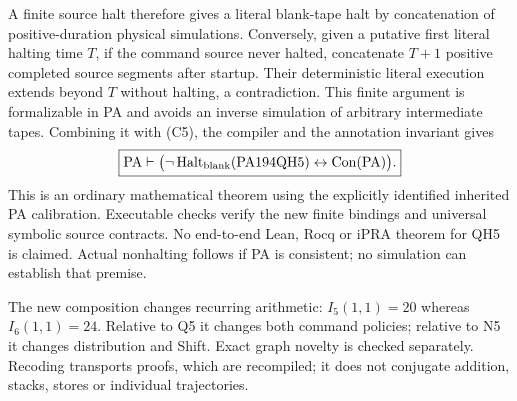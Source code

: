 A finite source halt therefore gives a literal blank-tape halt by
concatenation of positive-duration physical simulations. Conversely,
given a putative first literal halting time $T$, if the command source
never halted, concatenate $T+1$ positive completed source segments after
startup. Their deterministic literal execution extends beyond $T$
without halting, a contradiction. This finite argument is formalizable
in PA and avoids an inverse simulation of arbitrary intermediate tapes.
Combining it with (C5), the compiler and the annotation invariant gives
\[
 \boxed{\mathrm{PA}\vdash
 \bigl(\neg\operatorname{Halt}_{\rm blank}(\mathrm{PA194QH5})
                  \leftrightarrow\operatorname{Con}(\mathrm{PA})\bigr).}
\]
This is an ordinary mathematical theorem using the explicitly identified
inherited PA calibration. Executable checks verify the new finite
bindings and universal symbolic source contracts. No end-to-end Lean,
Rocq or iPRA theorem for QH5 is claimed. Actual nonhalting follows if PA
is consistent; no simulation can establish that premise.

The new composition changes recurring arithmetic: $I_5(1,1)=20$ whereas
$I_6(1,1)=24$. Relative to Q5 it changes both command policies; relative
to N5 it changes distribution and Shift. Exact graph novelty is checked
separately. Recoding transports proofs, which are recompiled; it does
not conjugate addition, stacks, stores or individual trajectories.
